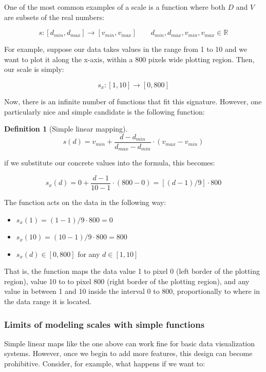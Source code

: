 \documentclass[
]{book}
\providecommand{\tightlist}{%
  \setlength{\itemsep}{0pt}\setlength{\parskip}{0pt}}
\theoremstyle{definition}
\newtheorem{definition}{Definition}[chapter]
\theoremstyle{definition}
\theoremstyle{definition}
\theoremstyle{definition}
\theoremstyle{remark}
\begin{document}
One of the most common examples of a scale is a function where both \(D\) and \(V\) are subsets of the real numbers:

\[s: [d_{min}, d_{max}] \to [v_{min}, v_{max}] \qquad d_{min}, d_{max}, v_{min}, v_{max} \in \mathbb{R}\]

For example, suppose our data takes values in the range from 1 to 10 and we want to plot it along the x-axis, within a 800 pixels wide plotting region. Then, our scale is simply:

\[s_x: [1, 10] \to [0, 800]\]

Now, there is an infinite number of functions that fit this signature. However, one particularly nice and simple candidate is the following function:

\begin{definition}[Simple linear mapping]
\protect\hypertarget{def:linear-mapping}{}\label{def:linear-mapping}\[s(d) = v_{min} + \frac{d - d_{min}}{d_{max} - d_{min}} \cdot (v_{max} - v_{min})\]
\end{definition}

if we substitute our concrete values into the formula, this becomes:

\[s_x(d) = 0 + \frac{d - 1}{10 - 1} \cdot (800 - 0) = [(d - 1) / 9] \cdot 800\]

The function acts on the data in the following way:

\begin{itemize}
\tightlist
\item
  \(s_x(1) = (1 - 1) / 9 \cdot 800 = 0\)
\item
  \(s_x(10) = (10 - 1) / 9 \cdot 800 = 800\)
\item
  \(s_x(d) \in [0, 800]\) for any \(d \in [1, 10]\)
\end{itemize}

That is, the function maps the data value 1 to pixel 0 (left border of the plotting region), value 10 to to pixel 800 (right border of the plotting region), and any value in between 1 and 10 inside the interval 0 to 800, proportionally to where in the data range it is located.

\subsubsection{Limits of modeling scales with simple functions}\label{simple-scale-limits}

Simple linear maps like the one above can work fine for basic data visualization systems. However, once we begin to add more features, this design can become prohibitive. Consider, for example, what happens if we want to:
\end{document}
